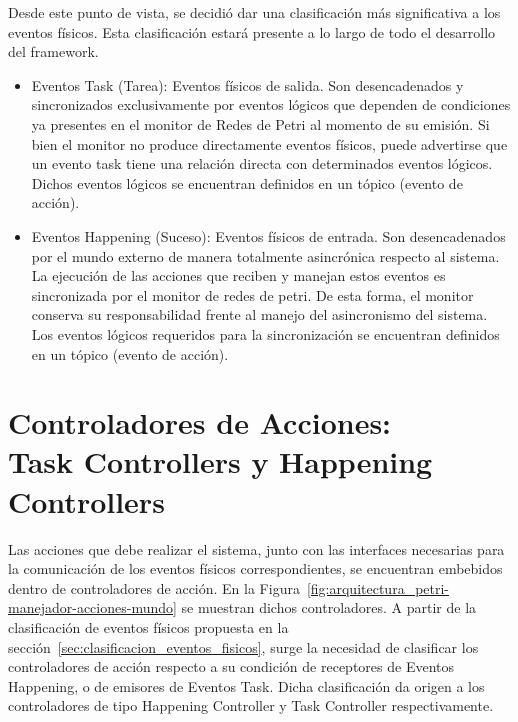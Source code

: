 Desde este punto de vista, se decidió dar una clasificación más significativa a
los eventos físicos. Esta clasificación estará presente a lo largo de todo
el desarrollo del framework.
\begin{itemize}
  \item Eventos Task (Tarea): Eventos físicos de salida. Son
  desencadenados y sincronizados exclusivamente por eventos lógicos que dependen
  de condiciones ya presentes en el monitor de Redes de Petri al momento de su
  emisión. Si bien el monitor no produce directamente eventos físicos, puede
  advertirse que un evento task tiene una relación directa con determinados
  eventos lógicos. Dichos eventos lógicos se encuentran definidos en un tópico
  (evento de acción).
  \item Eventos Happening (Suceso): Eventos físicos de entrada. Son
  desencadenados por el mundo externo de manera totalmente asincrónica respecto
  al sistema. La ejecución de las acciones que reciben y manejan estos eventos
  es sincronizada por el monitor de redes de petri. De esta forma, el monitor
  conserva su responsabilidad frente al manejo del asincronismo del sistema.
  Los eventos lógicos requeridos para la sincronización se encuentran definidos
  en un tópico (evento de acción).
\end{itemize}

\section{Controladores de Acciones: \\ Task Controllers y Happening Controllers}
\label{sec:controladores_de_acciones}
Las acciones que debe realizar el sistema, junto con las interfaces necesarias
para la comunicación de los eventos físicos correspondientes, se encuentran
embebidos dentro de controladores de acción. En la
Figura~\ref{fig:arquitectura_petri-manejador-acciones-mundo} se muestran dichos
controladores.
A partir de la clasificación de eventos físicos propuesta en la
sección~\ref{sec:clasificacion_eventos_fisicos}, surge la necesidad de
clasificar los controladores de acción respecto a su condición de receptores de
Eventos Happening, o de emisores de Eventos Task. Dicha clasificación da origen
a los controladores de tipo Happening Controller y Task Controller respectivamente.

